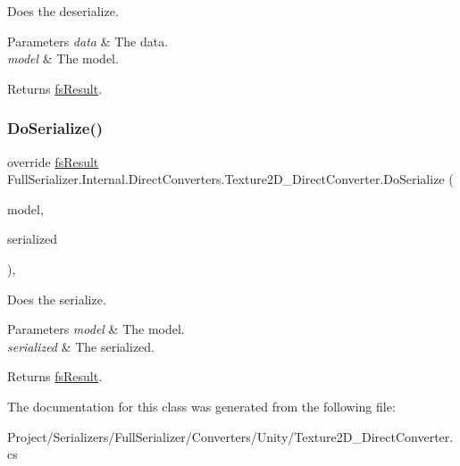 Does the deserialize. 


\begin{DoxyParams}{Parameters}
{\em data} & The data.\\
\hline
{\em model} & The model.\\
\hline
\end{DoxyParams}
\begin{DoxyReturn}{Returns}
\hyperlink{struct_full_serializer_1_1fs_result}{fs\+Result}.
\end{DoxyReturn}
\mbox{\label{class_full_serializer_1_1_internal_1_1_direct_converters_1_1_texture2_d___direct_converter_a590e355b26ac0221c95ef6475b5b16f6}} 
\subsubsection{\texorpdfstring{Do\+Serialize()}{DoSerialize()}}
{\footnotesize\ttfamily override \hyperlink{struct_full_serializer_1_1fs_result}{fs\+Result} Full\+Serializer.\+Internal.\+Direct\+Converters.\+Texture2\+D\+\_\+\+Direct\+Converter.\+Do\+Serialize (\begin{DoxyParamCaption}\item[{Texture2D}]{model,  }\item[{Dictionary$<$ string, \hyperlink{class_full_serializer_1_1fs_data}{fs\+Data} $>$}]{serialized }\end{DoxyParamCaption})\hspace{0.3cm}{\ttfamily [inline]}, {\ttfamily [protected]}}



Does the serialize. 


\begin{DoxyParams}{Parameters}
{\em model} & The model.\\
\hline
{\em serialized} & The serialized.\\
\hline
\end{DoxyParams}
\begin{DoxyReturn}{Returns}
\hyperlink{struct_full_serializer_1_1fs_result}{fs\+Result}.
\end{DoxyReturn}


The documentation for this class was generated from the following file\+:\begin{DoxyCompactItemize}
\item 
Project/\+Serializers/\+Full\+Serializer/\+Converters/\+Unity/Texture2\+D\+\_\+\+Direct\+Converter.\+cs\end{DoxyCompactItemize}
